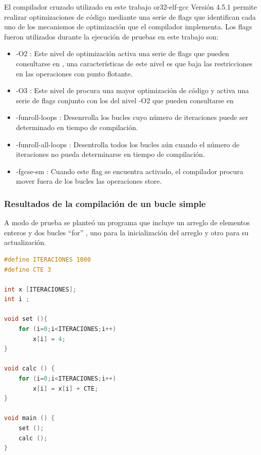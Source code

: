 El compilador cruzado utilizado en este trabajo or32-elf-gcc Versión 4.5.1 permite realizar optimizaciones de código mediante una serie de flags que
identifican cada uno de los mecanismos de optimización que el compilador implementa. Los flags fueron utilizados durante la ejecución de pruebas en
este trabajo son:

\begin{itemize}
  	\item -O2 : Este nivel de optimización activa una serie de flags que pueden consultarse en \cite{etiqueta_OptGcc}, una características de este nivel es que baja las restricciones en las operaciones con punto flotante.
	\item -O3 : Este nivel de procura una mayor optimización de código y activa una serie de flags conjunto con los del nivel -O2 que pueden consultarse
	en \cite{etiqueta_OptGcc}
	\item -funroll-loops : Desenrrolla los bucles cuyo número de iteraciones puede ser determinado en tiempo de compilación. 
	\item -funroll-all-loops : Desentrolla todos los bucles aún cuando el número de iteraciones no pueda determinarse en tiempo de compilación. 
	\item -fgcse-sm : Cuando este flag se encuentra activado, el compilador procura mover fuera de los bucles las operaciones store.
\end{itemize}

		\subsubsection{Resultados de la compilación de un bucle simple}

A modo de prueba se planteó un programa que incluye un arreglo de elementos enteros y dos bucles ``for'' , uno para la inicialización del arreglo y
otro para su actualización.

	\begin{lstlisting}[language=C,frame=single , caption={Código del programa de prueba de opciones de optimización del compilador (bucle simple) }]
#define ITERACIONES 1000
#define CTE 3

int x [ITERACIONES];
int i ;

void set (){
	for (i=0;i<ITERACIONES;i++)
		x[i] = 4;
}

void calc () {
	for (i=0;i<ITERACIONES;i++)
		x[i] = x[i] + CTE;
}

void main () {
	set ();
	calc ();
}
	\end{lstlisting}
		

